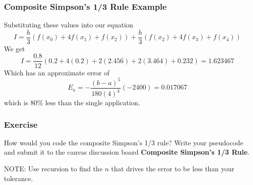 \documentclass{if-beamer}
\begin{document}
\begin{frame}[t]
	\frametitle{Composite Simpson’s 1/3 Rule Example}
	Substituting these values into our equation
	$$I = \frac{h}{3}(f(x_0)+4f(x_1)+f(x_2)) + \frac{h}{3}(f(x_2)+4f(x_3)+f(x_4))$$
	We get
	$$I = \frac{0.8}{12}(0.2+4(0.2)+2(2.456)+2(3.464)+0.232) = 1.623467$$
	Which has an approximate error of 
	$$E_a = -\frac{(b-a)^5}{180(4)^4}(-2400) = 0.017067$$
	which is 80\% less than the single application. 
\end{frame}


\begin{frame}
	\frametitle{Exercise}
	How would you code the composite Simpson's 1/3 rule? Write your pseudocode and submit it to the canvas discussion board \textbf{Composite Simpson's 1/3 Rule}. \\\vspace{10pt}
	
	NOTE: Use recursion to find the $n$ that drives the error to be less than your tolerance.
\end{frame}	
\end{document}
